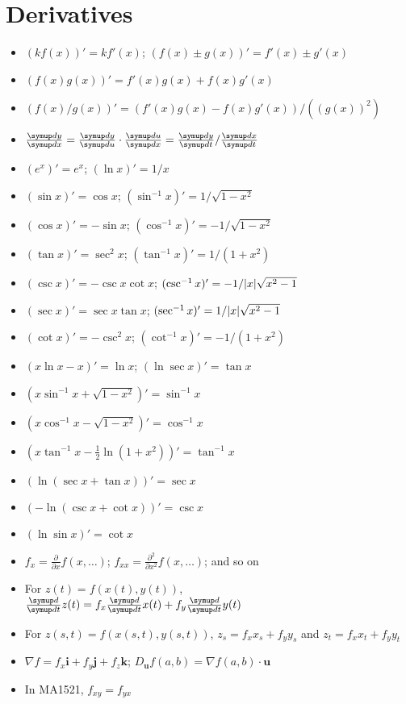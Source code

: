 \documentclass{slnotes}
\DeclarePairedDelimiter\abs{\lvert}{\rvert}%
\begin{document}
\section{Derivatives}
\begin{itemize}
\item \((kf(x))' = kf'(x)\); \((f(x) \pm g(x))' = f'(x) \pm g'(x)\)
\item \((f(x)g(x))' = f'(x)g(x) + f(x)g'(x)\)
\item \((f(x)/g(x))' = (f'(x)g(x)-f(x)g'(x))/((g(x))^2)\)
\item \(\sldd{y}{x} = \sldd{y}{u} \cdot \sldd{u}{x} = \sldd{y}{t}/\sldd{x}{t}\)
\item \((e^x)' = e^x\); \((\ln x)' = 1/x\)
\item \((\sin x)' = \cos x\); \((\sin^{-1} x)' = 1/\sqrt{1-x^2}\)
\item \((\cos x)' = -\sin x\); \((\cos^{-1} x)' = -1/\sqrt{1-x^2}\)
\item \((\tan x)' = \sec^2 x\); \((\tan^{-1} x)' = 1/(1+x^2)\)
\item \((\csc x)' = -\csc x \cot x\); \((\csc^{-1} x)' = -1/\abs{x}\sqrt{x^2-1}\)
\item \((\sec x)' = \sec x \tan x\); \((\sec^{-1} x)' = 1/\abs{x}\sqrt{x^2-1}\)
\item \((\cot x)' = -\csc^2 x\); \((\cot^{-1} x)' = -1/(1+x^2)\)
\item \((x\ln x - x)' = \ln x\); \((\ln\sec x)' = \tan x\)
\item \((x\sin^{-1}x + \sqrt{1-x^2})' = \sin^{-1}x\)
\item \((x\cos^{-1}x - \sqrt{1-x^2})' = \cos^{-1}x\)
\item \((x\tan^{-1}x-\frac{1}{2}\ln(1+x^2))' = \tan^{-1}x\)
\item \((\ln(\sec x + \tan x))' = \sec x\)
\item \((-\ln(\csc x + \cot x))' = \csc x\)
\item \((\ln\sin x)' = \cot x\)
\item \(f_x = \frac{\partial}{\partial x} f(x, \hdots)\); \(f_{xx} = \frac{\partial^2}{\partial x^2} f(x, \hdots)\); and so on
\item For \(z(t) = f(x(t), y(t))\),\\\(\sldd{}{t} z(t) = f_x \sldd{}{t} x(t) + f_y \sldd{}{t} y(t)\)
\item For \(z(s, t) = f(x(s, t), y(s, t))\), \(z_s = f_xx_s + f_yy_s\) and \(z_t = f_xx_t + f_yy_t\)
\item \(\nabla f = f_x\mathbf{i} + f_y\mathbf{j} + f_z\mathbf{k}\); \(D_{\mathbf{u}}f(a, b) = \nabla f(a, b)\cdot\mathbf{u}\)
\item In MA1521, \(f_{xy} = f_{yx}\)
\end{itemize}
\end{document}
